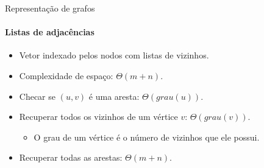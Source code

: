 \begin{frame}[t]{Representação de grafos}
	\framesubtitle{Listas de adjacências}
	
	\vspace{-5pt}
	
	\begin{itemize}
		\item {\color{magenta}Vetor indexado pelos nodos com listas de vizinhos.}
		\item Complexidade de espaço: $\Theta(m + n)$.
		\item Checar se $(u, v)$ é uma aresta: $\Theta(grau(u))$.
		\item Recuperar todos os vizinhos de um vértice $v$: $\Theta(grau(v))$.
		\begin{itemize}
			\item O grau de um vértice é o número de vizinhos que ele possui.
		\end{itemize}
		\item Recuperar todas as arestas: $\Theta(m + n)$.
	\end{itemize}

	\pause
	

\end{frame}
